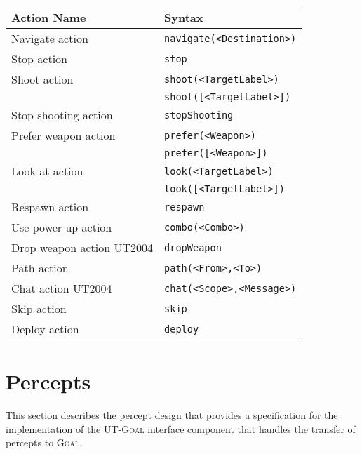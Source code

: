 \documentclass[11pt,a4paper]{article}
\newcommand{\Goal}{\textsc{Goal}}
\begin{document}
\begin{small}
\begin{tabular}{|p{4cm}|p{7cm}|}	
	\hline
Action Name			 	& Syntax\\
\hline\hline
Navigate action 			& \verb|navigate(<Destination>)|\\
Stop action				& \verb|stop| \\
Shoot action 				& \verb|shoot(<TargetLabel>)| \\
					& \verb|shoot([<TargetLabel>])| \\
Stop shooting action 		& \verb|stopShooting| \\
Prefer weapon action 		& \verb|prefer(<Weapon>)|\\
					& \verb|prefer([<Weapon>])|\\	
Look at action			& \verb|look(<TargetLabel>)|\\
					& \verb|look([<TargetLabel>])|\\
Respawn action			& \verb|respawn|\\
Use power up action		& \verb|combo(<Combo>)| \\
Drop weapon action UT2004 	& \verb|dropWeapon| \\
Path action				& \verb|path(<From>,<To>)|\\
Chat action UT2004			& \verb|chat(<Scope>,<Message>)|\\
Skip action				& \verb|skip|\\
Deploy action			& \verb|deploy|\\
\hline
\end{tabular}
\end{small}

\section{Percepts}
\label{sec:percepts}
This section describes the percept design that provides a specification for the implementation of the UT-{\Goal} interface component that handles the transfer of percepts to {\Goal}. 

\end{document}
